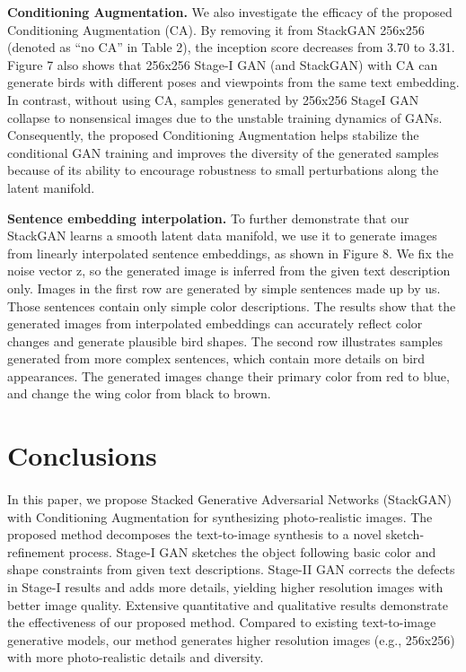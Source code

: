 \documentclass[a4paper,12pt,oneside]{article}
\begin{document}
\textbf{Conditioning Augmentation. }We also investigate the efficacy of the proposed Conditioning Augmentation (CA). By removing it from StackGAN 256x256 (denoted as “no CA” in Table 2), the inception score decreases from 3.70 to 3.31. Figure 7 also shows that 256x256 Stage-I GAN (and StackGAN) with CA can generate birds with different poses and viewpoints from the same text embedding. In contrast, without using CA, samples generated by 256x256 StageI GAN collapse to nonsensical images due to the unstable training dynamics of GANs. Consequently, the proposed Conditioning Augmentation helps stabilize the conditional GAN training and improves the diversity of the generated samples because of its ability to encourage robustness to small perturbations along the latent manifold. 

\textbf{Sentence embedding interpolation. }To further demonstrate that our StackGAN learns a smooth latent data manifold, we use it to generate images from linearly interpolated sentence embeddings, as shown in Figure 8. We fix the noise vector z, so the generated image is inferred from the given text description only. Images in the first row are generated by simple sentences made up by us. Those sentences contain only simple color descriptions. The results show that the generated images from interpolated embeddings can accurately reflect color changes and generate plausible bird shapes. The second row illustrates samples generated from more complex sentences, which contain more details on bird appearances. The generated images change their primary color from red to blue, and change the wing color from black to brown. 

\newpage
\section{Conclusions }
\paragraph{}
In this paper, we propose Stacked Generative Adversarial Networks (StackGAN) with Conditioning Augmentation for synthesizing photo-realistic images. The proposed method decomposes the text-to-image synthesis to a novel sketch-refinement process. Stage-I GAN sketches the object following basic color and shape constraints from given text descriptions. Stage-II GAN corrects the defects in Stage-I results and adds more details, yielding higher resolution images with better image quality. Extensive quantitative and qualitative results demonstrate the effectiveness of our proposed method. Compared to existing text-to-image generative models, our method generates higher resolution images (e.g., 256x256) with more photo-realistic details and diversity. 
\end{document}
